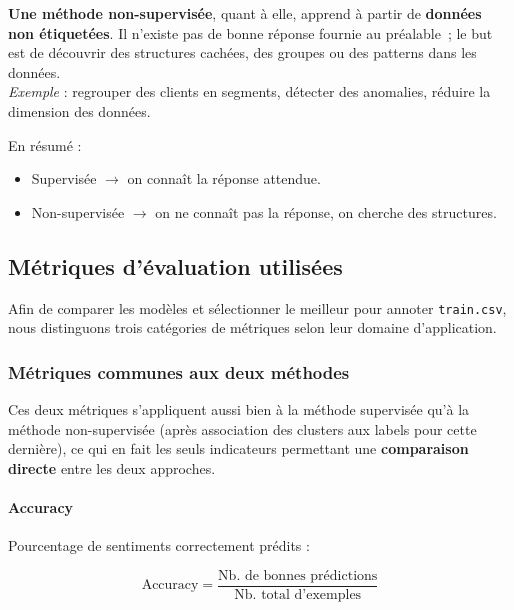 \documentclass[12pt,a4paper]{article}
\begin{document}
\textbf{Une méthode non-supervisée}, quant à elle, apprend à partir de \textbf{données non étiquetées}. Il n'existe pas de bonne réponse fournie au préalable~; le but est de découvrir des structures cachées, des groupes ou des patterns dans les données.\\
\textit{Exemple} : regrouper des clients en segments, détecter des anomalies, réduire la dimension des données.

En résumé :
\begin{itemize}
  \item Supervisée $\rightarrow$ on connaît la réponse attendue.
  \item Non-supervisée $\rightarrow$ on ne connaît pas la réponse, on cherche des structures.
\end{itemize}

\subsection{Métriques d'évaluation utilisées}

Afin de comparer les modèles et sélectionner le meilleur pour annoter \texttt{train.csv}, nous distinguons trois catégories de métriques selon leur domaine d'application.

\subsubsection{Métriques communes aux deux méthodes}

Ces deux métriques s'appliquent aussi bien à la méthode supervisée qu'à la méthode non-supervisée (après association des clusters aux labels pour cette dernière), ce qui en fait les seuls indicateurs permettant une \textbf{comparaison directe} entre les deux approches.

\paragraph{Accuracy}

Pourcentage de sentiments correctement prédits :

\[
  \text{Accuracy} = \frac{\text{Nb. de bonnes prédictions}}{\text{Nb. total d'exemples}}
\]
\end{document}
